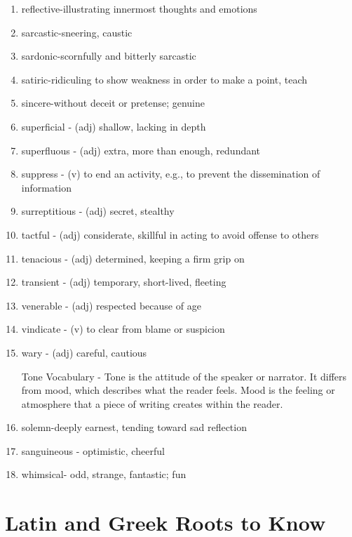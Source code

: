 \documentclass[12pt]{book}
\begin{document}
\begin{enumerate}
\bigskip
\item reflective-illustrating innermost thoughts and emotions
\item sarcastic-sneering, caustic
\item sardonic-scornfully and bitterly sarcastic
\item satiric-ridiculing to show weakness in order to make a point, teach
\item sincere-without deceit or pretense; genuine
 
\bigskip
\item superficial - (adj) shallow, lacking in depth
\item superfluous - (adj) extra, more than enough, redundant
\item suppress - (v) to end an activity, e.g., to prevent the dissemination of information
\item surreptitious - (adj) secret, stealthy
\item tactful - (adj) considerate, skillful in acting to avoid offense to others
\item tenacious - (adj) determined, keeping a firm grip on
\item transient - (adj) temporary, short-lived, fleeting
\item venerable - (adj) respected because of age
\item vindicate - (v) to clear from blame or suspicion
\item wary - (adj) careful, cautious

\bigskip
Tone Vocabulary - Tone is the attitude of the speaker or narrator.  It differs from mood, which describes what the reader feels.  Mood is the feeling or atmosphere that a piece of writing creates within the reader.  

\bigskip
\item solemn-deeply earnest, tending toward sad reflection
\item sanguineous - optimistic, cheerful
\item whimsical- odd, strange, fantastic; fun
\end{enumerate}

\section{Latin and Greek Roots to Know}
\end{document}
